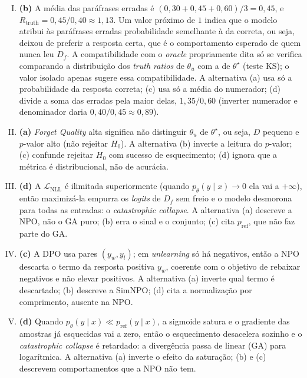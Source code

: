 \documentclass{dlproblemset}
\begin{document}
\begin{enumerate}[I)]
    \item \textbf{(b)} A média das paráfrases erradas é $(0{,}30 + 0{,}45 + 0{,}60)/3 = 0{,}45$, e $R_{\text{truth}} = 0{,}45/0{,}40 \approx 1{,}13$. Um valor próximo de $1$ indica que o modelo atribui às paráfrases erradas probabilidade semelhante à da correta, ou seja, deixou de preferir a resposta certa, que é o comportamento esperado de quem nunca leu $D_f$. A compatibilidade com o \textit{oracle} propriamente dita só se verifica comparando a distribuição dos \textit{truth ratios} de $\theta_u$ com a de $\theta^\star$ (teste KS); o valor isolado apenas sugere essa compatibilidade. A alternativa (a) usa só a probabilidade da resposta correta; (c) usa só a média do numerador; (d) divide a soma das erradas pela maior delas, $1{,}35/0{,}60$ (inverter numerador e denominador daria $0{,}40/0{,}45 \approx 0{,}89$).

    \item \textbf{(a)} \textit{Forget Quality} alta significa não distinguir $\theta_u$ de $\theta^\star$, ou seja, $D$ pequeno e $p$-valor alto (não rejeitar $H_0$). A alternativa (b) inverte a leitura do $p$-valor; (c) confunde rejeitar $H_0$ com sucesso de esquecimento; (d) ignora que a métrica é distribucional, não de acurácia.

    \item \textbf{(d)} A $\mathcal{L}_{\text{NLL}}$ é ilimitada superiormente (quando $p_\theta(y\mid x)\to 0$ ela vai a $+\infty$), então maximizá-la empurra os \textit{logits} de $D_f$ sem freio e o modelo desmorona para todas as entradas: o \textit{catastrophic collapse}. A alternativa (a) descreve a NPO, não o GA puro; (b) erra o sinal e o conjunto; (c) cita $p_{\text{ref}}$, que não faz parte do GA.

    \item \textbf{(c)} A DPO usa pares $(y_w, y_l)$; em \textit{unlearning} só há negativos, então a NPO descarta o termo da resposta positiva $y_w$, coerente com o objetivo de rebaixar negativos e não elevar positivos. A alternativa (a) inverte qual termo é descartado; (b) descreve a SimNPO; (d) cita a normalização por comprimento, ausente na NPO.

    \item \textbf{(d)} Quando $p_\theta(y\mid x) \ll p_{\text{ref}}(y\mid x)$, a sigmoide satura e o gradiente das amostras já esquecidas vai a zero, então o esquecimento desacelera sozinho e o \textit{catastrophic collapse} é retardado: a divergência passa de linear (GA) para logarítmica. A alternativa (a) inverte o efeito da saturação; (b) e (c) descrevem comportamentos que a NPO não tem.


\end{enumerate}
\end{document}
